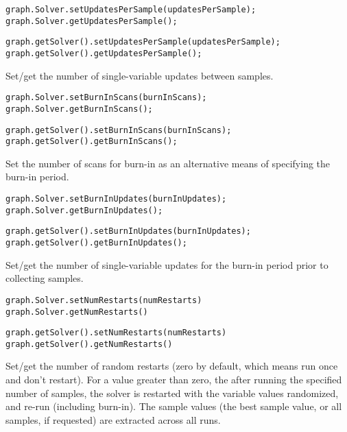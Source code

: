 \ifmatlab
\begin{lstlisting}
graph.Solver.setUpdatesPerSample(updatesPerSample);
graph.Solver.getUpdatesPerSample();
\end{lstlisting}
\fi

\ifjava
\begin{lstlisting}
graph.getSolver().setUpdatesPerSample(updatesPerSample);
graph.getSolver().getUpdatesPerSample();
\end{lstlisting}
\fi


Set/get the number of single-variable updates between samples.

\ifmatlab
\begin{lstlisting}
graph.Solver.setBurnInScans(burnInScans);
graph.Solver.getBurnInScans();
\end{lstlisting}
\fi

\ifjava
\begin{lstlisting}
graph.getSolver().setBurnInScans(burnInScans);
graph.getSolver().getBurnInScans();
\end{lstlisting}
\fi

Set the number of scans for burn-in as an alternative means of specifying the burn-in period.

\ifmatlab
\begin{lstlisting}
graph.Solver.setBurnInUpdates(burnInUpdates);
graph.Solver.getBurnInUpdates();
\end{lstlisting}
\fi

\ifjava
\begin{lstlisting}
graph.getSolver().setBurnInUpdates(burnInUpdates);
graph.getSolver().getBurnInUpdates();
\end{lstlisting}
\fi

Set/get the number of single-variable updates for the burn-in period prior to collecting samples.

\ifmatlab
\begin{lstlisting}
graph.Solver.setNumRestarts(numRestarts)
graph.Solver.getNumRestarts() 
\end{lstlisting}
\fi

\ifjava
\begin{lstlisting}
graph.getSolver().setNumRestarts(numRestarts)
graph.getSolver().getNumRestarts() 
\end{lstlisting}
\fi

Set/get the number of random restarts (zero by default, which means run once and don't restart).  For a value greater than zero, the after running the specified number of samples, the solver is restarted with the variable values randomized, and re-run (including burn-in).  The sample values (the best sample value, or all samples, if requested) are extracted across all runs.

